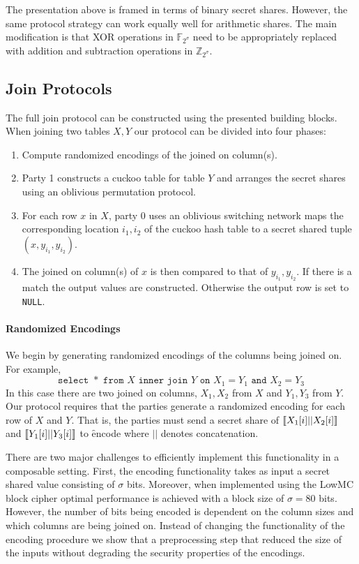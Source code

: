 The presentation above is framed in terms of binary secret shares. However, the same protocol strategy can work equally well for arithmetic shares. The main modification is that XOR operations in $\mathbb{F}_{2^\sigma}$ need to be appropriately replaced with addition and subtraction operations in $\mathbb{Z}_{2^\sigma}$. 


\subsection{Join Protocols}\label{sec:join}

The full join protocol can be constructed using the presented building blocks. When joining two tables $X,Y$ our protocol can be divided into four phases:

\begin{enumerate}
	\item Compute randomized encodings of the joined on column(s). 
	\item Party 1 constructs a cuckoo table for table $Y$ and arranges the secret shares using an oblivious permutation protocol. 
	\item For each row $x$ in $X$, party 0 uses an oblivious switching network maps the corresponding location $i_1,i_2$ of the cuckoo hash table to a secret shared tuple $(x, y_{i_1}, y_{i_2})$.
	\item The joined on column(s) of $x$ is then compared to that of $y_{i_1}, y_{i_2}$. If there is a match the output values are constructed. Otherwise the output row is set to \texttt{NULL}.
\end{enumerate} 

\paragraph{Randomized Encodings}
We begin by generating randomized encodings of the columns being joined on. For example, 
$$
	\texttt{select }* \texttt{ from } X \texttt{ inner join } Y \texttt{ on } X_1 = Y_1 \texttt{ and } X_2 = Y_3
$$
In this case there are two joined on columns, $X_1,X_2$ from $X$ and $Y_1,Y_3$ from $Y$. Our protocol requires that the parties generate a randomized encoding for each row of $X$ and $Y$. That is, the parties must send a secret share of $\llbracket X_1[i] || X_2[i]\rrbracket$ and $\llbracket Y_1[i] || Y_3[i]\rrbracket$ to \f{encode} where $||$ denotes concatenation. 

There are two major challenges to efficiently implement this functionality in a composable setting. First, the encoding functionality takes as input a secret shared value consisting of $\sigma$ bits. Moreover, when implemented using the LowMC block cipher optimal performance is achieved with a block size of $\sigma=80$ bits. However, the number of bits being encoded is dependent on the column sizes and which columns are being joined on. Instead of changing the functionality of the encoding procedure we show that a preprocessing step that reduced the size of the inputs without degrading the security properties of the encodings. 

